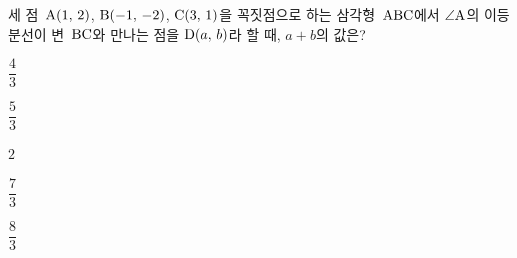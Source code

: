 세 점~$\mathrm{A}(1,\mkern3mu 2)$, $\mathrm{B}(-1,\mkern3mu -2)$, $\mathrm{C}(3,\mkern3mu 1)$을 꼭짓점으로 하는 삼각형~$\mathrm{ABC}$에서 $\angle\mathrm{A}$의 이등분선이 변~$\mathrm{BC}$와 만나는 점을 $\mathrm{D}(a,\mkern3mu b)$라 할 때, $a+b$의 값은?
\begin{choices32}{\rule[-3ex]{0pt}{8ex}$\dfrac{4}{3}$}{\rule[-3ex]{0pt}{8ex}$\dfrac{5}{3}$}{\rule[-3ex]{0pt}{8ex}$2$}{\rule[-3ex]{0pt}{8ex}$\dfrac{7}{3}$}{\rule[-3ex]{0pt}{8ex}$\dfrac{8}{3}$}\end{choices32}
